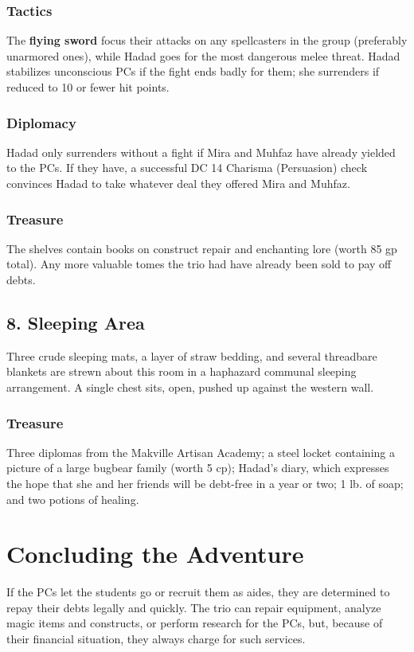 \documentclass[10pt,a4paper,twoside,bg=print,twocolumn,openany,nodeprecatedcode]{dndbook}
\begin{document}
\subsubsection{Tactics}
The \textbf{flying sword} focus their attacks on any spellcasters in the group (preferably unarmored ones), while Hadad goes for the most dangerous melee threat. Hadad stabilizes unconscious PCs if the fight ends badly for them; she surrenders if reduced to 10 or fewer hit points.

\subsubsection{Diplomacy}
Hadad only surrenders without a fight if Mira and Muhfaz have already yielded to the PCs. If they have, a successful DC 14 Charisma (Persuasion) check convinces Hadad to take whatever deal they offered Mira and Muhfaz.

\subsubsection{Treasure}
The shelves contain books on construct repair and enchanting lore (worth 85 gp total). Any more valuable tomes the trio had have already been sold to pay off debts.

\subsection{8. Sleeping Area}
\begin{DndReadAloud}{}
Three crude sleeping mats, a layer of straw bedding, and several threadbare blankets are strewn about this room in a haphazard communal sleeping arrangement. A single chest sits, open, pushed up against the western wall.

\end{DndReadAloud}

\subsubsection{Treasure}
Three diplomas from the Makville Artisan Academy; a steel locket containing a picture of a large bugbear family (worth 5 cp); Hadad's diary, which expresses the hope that she and her friends will be debt-free in a year or two; 1 lb. of soap; and two potions of healing.

\section{Concluding the Adventure}
If the PCs let the students go or recruit them as aides, they are determined to repay their debts legally and quickly. The trio can repair equipment, analyze magic items and constructs, or perform research for the PCs, but, because of their financial situation, they always charge for such services.
\end{document}
